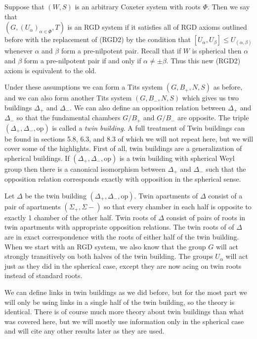 \documentclass[class=book, crop=false,12 pt]{standalone}
\begin{document}
Suppose that $(W,S)$ is an arbitrary Coxeter system with roots $\Phi.$ Then we say that \\$(G,(U_\alpha)_{\alpha\in \Phi},T)$ is an RGD system if it satisfies all of RGD axioms outlined before with the replacement of (RGD2) by the condition that $[U_\alpha,U_\beta]\le U_{(\alpha,\beta)}$ whenever $\alpha$ and $\beta$ form a pre-nilpotent pair. Recall that if $W$ is spherical then $\alpha$ and $\beta$ form a pre-nilpotent pair if and only if $\alpha\neq \pm \beta.$ Thus this new (RGD2) axiom is equivalent to the old. 

Under these assumptions we can form a Tits system $(G,B_+,N,S)$ as before, and we can also form another Tits system $(G,B_-,N,S)$ which gives us two buildings $\Delta_+$ and $\Delta_-.$ We can also define an opposition relation between $\Delta_+$ and $\Delta_-$ so that the fundamental chambers $G/B_+$ and $G/B_-$ are opposite. The triple $(\Delta_+,\Delta_-,\mathrm{op})$ is called a \emph{twin building}. A full treatment of Twin buildings can be found in sections 5.8, 6.3, and 8.3 of \cite{buildings} which we will not repeat here, but we will cover some of the highlights. First of all, twin buildings are a generalization of spherical buildings. If $(\Delta_+,\Delta_-,\mathrm{op})$ is a twin building with spherical Weyl group then there is a canonical isomorphism between $\Delta_+$ and $\Delta_-$ such that the opposition relation corresponds exactly with opposition in the spherical sense.

Let $\Delta$ be the twin building $(\Delta_+,\Delta_-,\mathrm{op}).$ Twin apartments of $\Delta$ consist of a pair of apartments $(\Sigma_+,\Sigma-)$ so that every chamber in each half is opposite to exactly 1 chamber of the other half. Twin roots of $\Delta$ consist of pairs of roots in twin apartments with appropriate opposition relations. The twin roots of of $\Delta$ are in exact correspondence with the roots of either half of the twin building. When we start with an RGD system, we also know that the group $G$ will act strongly transitively on both halves of the twin building. The groups $U_\alpha$ will act just as they did in the spherical case, except they are now acing on twin roots instead of standard roots.

We can define links in twin buildings as we did before, but for the most part we will only be using links in a single half of the twin building, so the theory is identical. There is of course much more theory about twin buildings than what was covered here, but we will mostly use information only in the spherical case and will cite any other results later as they are used.
\end{document}
